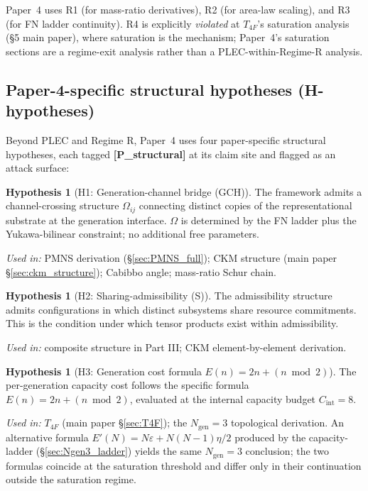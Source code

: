\documentclass[11pt]{article}
\newcommand{\epitag}[1]{\textbf{[#1]}}
\theoremstyle{definition}
\newtheorem{hypothesis}[theorem]{Hypothesis}
\begin{document}
Paper~4 uses R1 (for mass-ratio derivatives), R2 (for area-law scaling), and R3 (for FN ladder continuity). R4 is explicitly \emph{violated} at $T_{4F}$'s saturation analysis (\S5 main paper), where saturation is the mechanism; Paper~4's saturation sections are a regime-exit analysis rather than a PLEC-within-Regime-R analysis.

\subsection{Paper-4-specific structural hypotheses (H-hypotheses)}\label{sec:assumptions_H}

Beyond PLEC and Regime R, Paper~4 uses four paper-specific structural hypotheses, each tagged \epitag{P\_structural} at its claim site and flagged as an attack surface:

\begin{hypothesis}[H1: Generation-channel bridge (GCH)]\label{H:GCH}
The framework admits a channel-crossing structure $\Omega_{ij}$ connecting distinct copies of the representational substrate at the generation interface. $\Omega$ is determined by the FN ladder plus the Yukawa-bilinear constraint; no additional free parameters.
\end{hypothesis}
\emph{Used in:} PMNS derivation (\S\ref{sec:PMNS_full}); CKM structure (main paper \S\ref{sec:ckm_structure}); Cabibbo angle; mass-ratio Schur chain.

\begin{hypothesis}[H2: Sharing-admissibility (S)]\label{H:S}
The admissibility structure admits configurations in which distinct subsystems share resource commitments. This is the condition under which tensor products exist within admissibility.
\end{hypothesis}
\emph{Used in:} composite structure in Part III; CKM element-by-element derivation.

\begin{hypothesis}[H3: Generation cost formula $E(n) = 2n + (n \bmod 2)$]\label{H:gen_cost}
The per-generation capacity cost follows the specific formula $E(n) = 2n + (n \bmod 2)$, evaluated at the internal capacity budget $C_{\mathrm{int}} = 8$.
\end{hypothesis}
\emph{Used in:} $T_{4F}$ (main paper \S\ref{sec:T4F}); the $N_{\mathrm{gen}} = 3$ topological derivation. An alternative formula $E'(N) = N\varepsilon + N(N-1)\eta/2$ produced by the capacity-ladder (\S\ref{sec:Ngen3_ladder}) yields the same $N_{\mathrm{gen}} = 3$ conclusion; the two formulas coincide at the saturation threshold and differ only in their continuation outside the saturation regime.
\end{document}
